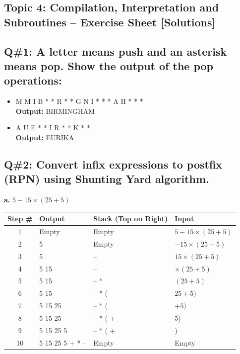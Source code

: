 \subsection{Topic 4: Compilation, Interpretation and Subroutines – Exercise Sheet [Solutions]}

\subsection*{Q\#1: A letter means push and an asterisk means pop. Show the output of the pop operations:}

\begin{itemize}
\item[a.] M M I B * * R * * G N I * * * A H * * * \\
\textbf{Output:} BIRMINGHAM

\item[b.] A U E * * I R * * K * * \\
\textbf{Output:} EURIKA
\end{itemize}

\subsection*{Q\#2: Convert infix expressions to postfix (RPN) using Shunting Yard algorithm.}
\textbf{a. } $5 - 15 \times (25 + 5)$

\begin{tabularx}{\textwidth}{|c|X|X|X|}
\hline
\textbf{Step \#} & \textbf{Output} & \textbf{Stack (Top on Right)} & \textbf{Input} \\
\hline
1 & Empty & Empty & $5 - 15 \times (25 + 5)$ \\
\hline
2 & 5 & Empty & $- 15 \times (25 + 5)$ \\
\hline
3 & 5 & – & $15 \times (25 + 5)$ \\
\hline
4 & 5 15 & – & $\times (25 + 5)$ \\
\hline
5 & 5 15 & – * & $(25 + 5)$ \\
\hline
6 & 5 15 & – * ( & $25 + 5)$ \\
\hline
7 & 5 15 25 & – * ( & $+ 5)$ \\
\hline
8 & 5 15 25 & – * ( + & 5) \\
\hline
9 & 5 15 25 5 & – * ( + & ) \\
\hline
10 & 5 15 25 5 + * – & Empty & Empty \\
\hline
\end{tabularx}

\vspace{1em}

